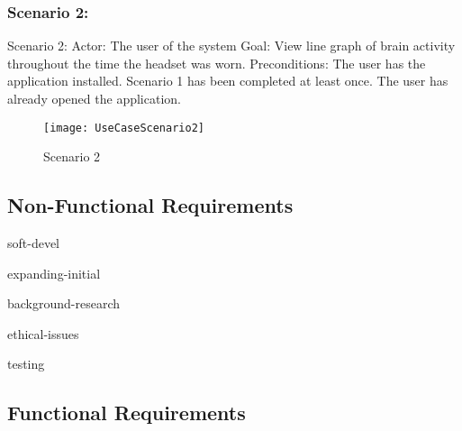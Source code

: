 \subsubsection{Scenario 2:}\label{ssec:scenar2}
Scenario 2:
Actor: The user of the system
Goal: View line graph of  brain activity throughout the time the headset was worn.
Preconditions:
The user has the application installed.
Scenario 1 has been completed at least once.
The user has already opened the application.
\begin{figure}[H]
  \centering
  \texttt{[image: UseCaseScenario2]}
  \caption{Scenario 2}\label{img:usecasescenario2}
\end{figure}

\subsection{Non-Functional Requirements}\label{ssec:non-functional-requirements}

\renewcommand*{\arraystretch}{1.4}
\begin{reqsection}{soft-devel}  
\end{reqsection}

\begin{reqsection}{expanding-initial}
\end{reqsection}

\begin{reqsection}{background-research}
\end{reqsection}

\begin{reqsection}{ethical-issues}
\end{reqsection}

\begin{reqsection}{testing}
\end{reqsection}

\subsection{Functional Requirements}\label{ssec:functional-requirements}

